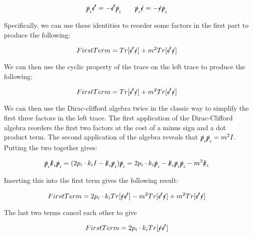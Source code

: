 \documentclass[a4]{article}
\begin{document}
    \begin{equation}
        \slashed{p}_i \slashed{\epsilon'} = - \slashed{\epsilon'} \slashed{p}_i \qquad \slashed{p}_i \slashed{\epsilon} = - \slashed{\epsilon} \slashed{p}_i
    \end{equation}

    Specifically, we can use these identities to reorder some factors in the first part to produce the following:

    \begin{equation}
        First Term = Tr [\slashed{\epsilon'} \slashed{\epsilon}] + m^2 Tr [\slashed{\epsilon'} \slashed{\epsilon}]
    \end{equation}

    We can then use the cyclic property of the trace on the left trace to produce the following:

    \begin{equation}
        First Term = Tr [\slashed{\epsilon'} \slashed{\epsilon}] + m^2 Tr [\slashed{\epsilon'} \slashed{\epsilon}]
    \end{equation}

    We can then use the Dirac-clifford algebra twice in the classic way to simplify the first three factors in the left trace.
    The first application of the Dirac-Clifford algebra reorders the first two factors at the cost of a minus sign and a dot
    product term. The second application of the algebra reveals that $\slashed{p}_i \slashed{p}_i = m^2 I$. Putting the two
    together gives:

    \begin{equation}
        \slashed{p}_i \slashed{k}_i \slashed{p}_i = (2 p_i \cdot k_i I - \slashed{k}_i \slashed{p}_i) \slashed{p}_i = 2 p_i \cdot k_i \slashed{p}_i - \slashed{k}_i \slashed{p}_i \slashed{p}_i - m^2 \slashed{k}_i
    \end{equation}

    Inserting this into the first term gives the following result:

    \begin{equation}
        First Term = 2 p_i \cdot k_i Tr[\slashed{\epsilon} \slashed{\epsilon'}] - m^2 Tr [\slashed{\epsilon'} \slashed{\epsilon}] + m^2 Tr [\slashed{\epsilon'} \slashed{\epsilon}]
    \end{equation}

    The last two terms cancel each other to give

    \begin{equation}
        First Term = 2 p_i \cdot k_i Tr[\slashed{\epsilon} \slashed{\epsilon'}]
    \end{equation}
\end{document}
